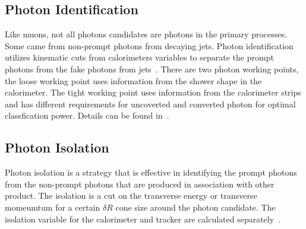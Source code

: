 \subsection{Photon Identification}
Like muons, not all photons candidates are photons in the primary processes. Some came from non-prompt photons from decaying jets. Photon identification utilizes kinematic cuts from calorimeters variables to separate the prompt photons from the fake photons from jets~\cite{gammaCalibration2019}.
There are two photon working points, the loose working point uses information from the shower shape in the calorimeter. The tight working point uses information from the calorimeter strips and has different requirements for uncoverted and converted photon for optimal classfication power. Details can be found in~\cite{gammaCalibration2019}. 

\subsection{Photon Isolation}
Photon isolation is a strategy that is effective in identifying the prompt photons from the non-prompt photons that are produced in association with other product. The isolation is a cut on the transverse energy or transverse momeumtum for a certain $\delta R $ cone size around the photon candidate. The isolation variable for the calorimeter and tracker are calculated separately~\cite{gammaCalibration2019}.

%
%


